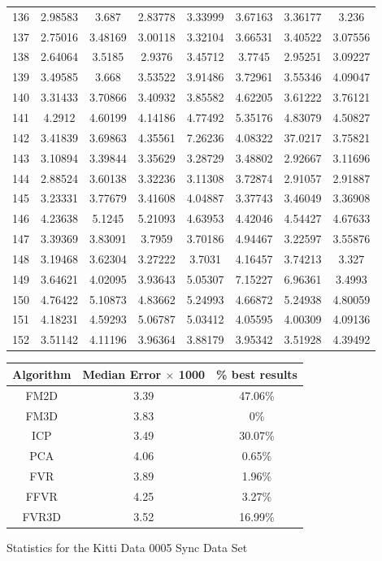 \begin{figure}
\begin{tabular}{cccccccc}
136 & 2.98583 & 3.687 & 2.83778 & 3.33999 & 3.67163 & 3.36177 & 3.236\\
137 & 2.75016 & 3.48169 & 3.00118 & 3.32104 & 3.66531 & 3.40522 & 3.07556\\
138 & 2.64064 & 3.5185 & 2.9376 & 3.45712 & 3.7745 & 2.95251 & 3.09227\\
139 & 3.49585 & 3.668 & 3.53522 & 3.91486 & 3.72961 & 3.55346 & 4.09047\\
140 & 3.31433 & 3.70866 & 3.40932 & 3.85582 & 4.62205 & 3.61222 & 3.76121\\
141 & 4.2912 & 4.60199 & 4.14186 & 4.77492 & 5.35176 & 4.83079 & 4.50827\\
142 & 3.41839 & 3.69863 & 4.35561 & 7.26236 & 4.08322 & 37.0217 & 3.75821\\
143 & 3.10894 & 3.39844 & 3.35629 & 3.28729 & 3.48802 & 2.92667 & 3.11696\\
144 & 2.88524 & 3.60138 & 3.32236 & 3.11308 & 3.72874 & 2.91057 & 2.91887\\
145 & 3.23331 & 3.77679 & 3.41608 & 4.04887 & 3.37743 & 3.46049 & 3.36908\\
146 & 4.23638 & 5.1245 & 5.21093 & 4.63953 & 4.42046 & 4.54427 & 4.67633\\
147 & 3.39369 & 3.83091 & 3.7959 & 3.70186 & 4.94467 & 3.22597 & 3.55876\\
148 & 3.19468 & 3.62304 & 3.27222 & 3.7031 & 4.16457 & 3.74213 & 3.327\\
149 & 3.64621 & 4.02095 & 3.93643 & 5.05307 & 7.15227 & 6.96361 & 3.4993\\
150 & 4.76422 & 5.10873 & 4.83662 & 5.24993 & 4.66872 & 5.24938 & 4.80059\\
151 & 4.18231 & 4.59293 & 5.06787 & 5.03412 & 4.05595 & 4.00309 & 4.09136\\
152 & 3.51142 & 4.11196 & 3.96364 & 3.88179 & 3.95342 & 3.51928 & 4.39492\\
\end{tabular}
\vspace{10mm}
\centering
\begin{tabular}{ccc}
\hline
\textbf{Algorithm} & \textbf{Median Error $\times$ 1000} & \textbf{\% best results}\\ \hline
FM2D	& 3.39 & 47.06\%\\
FM3D	& 3.83 & 0\%\\
ICP	& 3.49 & 30.07\%\\
PCA	& 4.06 & 0.65\%\\
FVR	& 3.89 & 1.96\%\\
FFVR	& 4.25 & 3.27\%\\
FVR3D	& 3.52 & 16.99\%\\
\end{tabular}
\caption{Statistics for the Kitti Data 0005 Sync Data Set}
\label{tab:kittidata0005sync}
\end{figure} 


